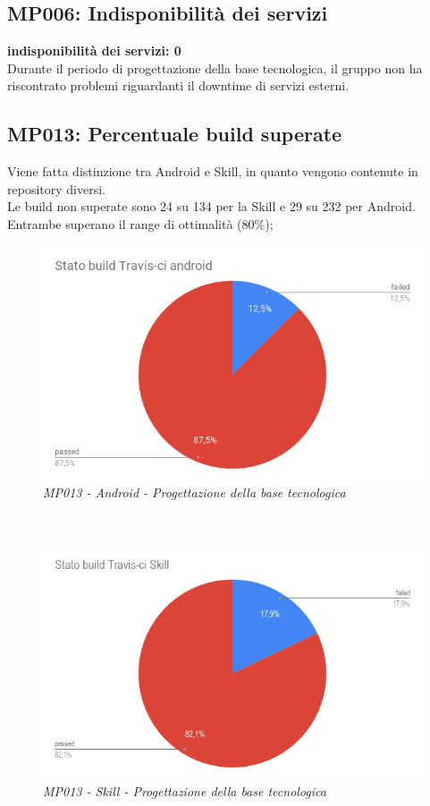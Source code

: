 \subsection{MP006: Indisponibilità dei servizi}
\textbf{indisponibilità dei servizi: 0}\\
Durante il periodo di progettazione della base tecnologica, il gruppo non ha riscontrato problemi riguardanti il downtime di servizi esterni.

\subsection{MP013: Percentuale build superate}
Viene fatta distinzione tra Android e Skill, in quanto vengono contenute in repository diversi.\\
Le build non superate sono 24 su 134 per la Skill e 29 su 232 per Android. Entrambe superano il range di ottimalità (80\%);
\begin{figure} [h]
    \centering
	\includegraphics[scale=0.5]{./images/StatobuildTravis-ciandroid.png}
    \caption{\textit{MP013 - Android - Progettazione della base tecnologica}}\label{}
\end{figure}\\
\begin{figure} [h]
    \centering
	\includegraphics[scale=0.5]{./images/StatobuildTravis-ciSkill.png}
    \caption{\textit{MP013 - Skill - Progettazione della base tecnologica}}\label{}
\end{figure}
\clearpage

